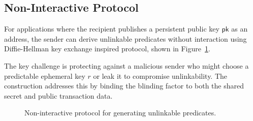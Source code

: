 \subsection{Non-Interactive Protocol}\label{sec:private-non-interactive}

For applications where the recipient publishes a persistent public key $\mathsf{pk}$ as an address, the sender can derive unlinkable predicates without interaction using Diffie-Hellman key exchange inspired protocol, shown in Figure~\ref{fig:private-non-interactive}.

The key challenge is protecting against a malicious sender who might choose a predictable ephemeral key $r$ or leak it to compromise unlinkability. The construction addresses this by binding the blinding factor to both the shared secret and public transaction data.

\begin{figure}[!htb]
\centering
{}
\caption{Non-interactive protocol for generating unlinkable predicates.}
\label{fig:private-non-interactive}
\end{figure}

